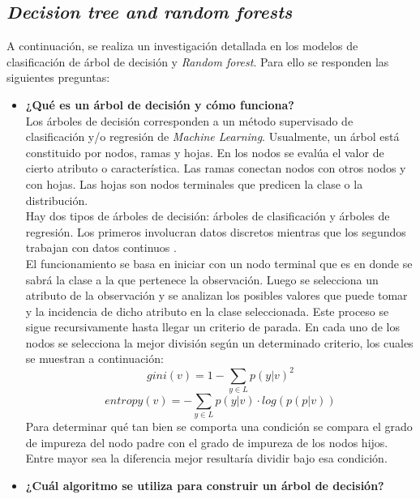 \subsection{\textit{Decision tree and random forests}}

A continuación, se realiza un investigación detallada en los modelos de clasificación de árbol de decisión y \textit{Random forest}. Para ello se responden las siguientes preguntas:
\begin{itemize}
    \item \textbf{¿Qué es un árbol de decisión y cómo funciona?}\\
    
    Los árboles de decisión corresponden a un método supervisado de clasificación y/o regresión de \textit{Machine Learning}. Usualmente, un árbol está constituido por nodos, ramas y hojas. En los nodos se evalúa el valor de cierto atributo o característica. Las ramas conectan nodos con otros nodos y con hojas. Las hojas son nodos terminales que predicen la clase o la distribución.\\
    Hay dos tipos de árboles de decisión: árboles de clasificación y árboles de regresión. Los primeros involucran datos discretos mientras que los segundos trabajan con datos continuos \cite{Sklearn-DT}. \\
    El funcionamiento se basa en iniciar con un nodo terminal que es en donde se sabrá la clase a la que pertenece la observación. Luego se selecciona un atributo de la observación y se analizan los posibles valores que puede tomar y la incidencia de dicho atributo en la clase seleccionada. Este proceso se sigue recursivamente hasta llegar un criterio de parada. En cada uno de los nodos se selecciona la mejor división según un determinado criterio, los cuales se muestran a continuación:
    \begin{equation}
        gini(v) = 1-\sum_{y \in L} p(y|v)^2
    \end{equation}
    \begin{equation}
        entropy(v) = -\sum_{y \in L} p(y|v) \cdot log(p(p|v))
    \end{equation}
    Para determinar qué tan bien se comporta una condición se compara el grado de impureza del nodo padre con el grado de impureza de los nodos hijos. Entre mayor sea la diferencia mejor resultaría dividir bajo esa condición.  
    
    \item \textbf{¿Cuál algoritmo se utiliza para construir un árbol de decisión?}\\
    

\end{itemize}
